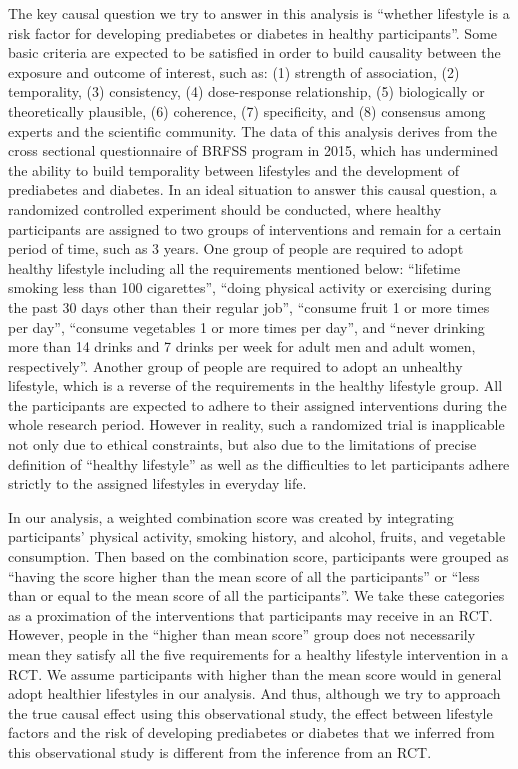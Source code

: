 \documentclass[
  12pt,
]{article}
\begin{document}
The key causal question we try to answer in this analysis is ``whether
lifestyle is a risk factor for developing prediabetes or diabetes in
healthy participants''. Some basic criteria are expected to be satisfied
in order to build causality between the exposure and outcome of
interest, such as: (1) strength of association, (2) temporality, (3)
consistency, (4) dose-response relationship, (5) biologically or
theoretically plausible, (6) coherence, (7) specificity, and (8)
consensus among experts and the scientific community. The data of this
analysis derives from the cross sectional questionnaire of BRFSS program
in 2015, which has undermined the ability to build temporality between
lifestyles and the development of prediabetes and diabetes. In an ideal
situation to answer this causal question, a randomized controlled
experiment should be conducted, where healthy participants are assigned
to two groups of interventions and remain for a certain period of time,
such as 3 years. One group of people are required to adopt healthy
lifestyle including all the requirements mentioned below: ``lifetime
smoking less than 100 cigarettes'', ``doing physical activity or
exercising during the past 30 days other than their regular job'',
``consume fruit 1 or more times per day'', ``consume vegetables 1 or
more times per day'', and ``never drinking more than 14 drinks and 7
drinks per week for adult men and adult women, respectively''. Another
group of people are required to adopt an unhealthy lifestyle, which is a
reverse of the requirements in the healthy lifestyle group. All the
participants are expected to adhere to their assigned interventions
during the whole research period. However in reality, such a randomized
trial is inapplicable not only due to ethical constraints, but also due
to the limitations of precise definition of ``healthy lifestyle'' as
well as the difficulties to let participants adhere strictly to the
assigned lifestyles in everyday life.

In our analysis, a weighted combination score was created by integrating
participants' physical activity, smoking history, and alcohol, fruits,
and vegetable consumption. Then based on the combination score,
participants were grouped as ``having the score higher than the mean
score of all the participants'' or ``less than or equal to the mean
score of all the participants''. We take these categories as a
proximation of the interventions that participants may receive in an
RCT. However, people in the ``higher than mean score'' group does not
necessarily mean they satisfy all the five requirements for a healthy
lifestyle intervention in a RCT. We assume participants with higher than
the mean score would in general adopt healthier lifestyles in our
analysis. And thus, although we try to approach the true causal effect
using this observational study, the effect between lifestyle factors and
the risk of developing prediabetes or diabetes that we inferred from
this observational study is different from the inference from an RCT.
\end{document}
